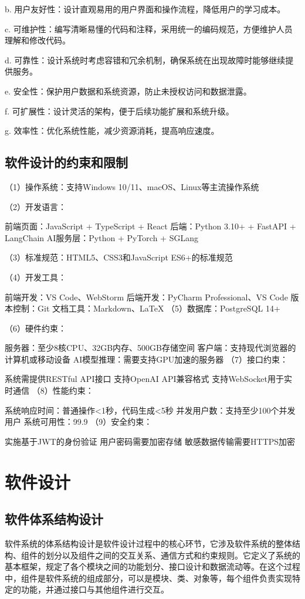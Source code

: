 \documentclass[
    report,     %
    oneside,    %
    UTF8,       %
    zihao=-4    %
]{config} %
\begin{document}
b. 用户友好性：设计直观易用的用户界面和操作流程，降低用户的学习成本。

c. 可维护性：编写清晰易懂的代码和注释，采用统一的编码规范，方便维护人员理解和修改代码。

d. 可靠性：设计系统时考虑容错和冗余机制，确保系统在出现故障时能够继续提供服务。

e. 安全性：保护用户数据和系统资源，防止未授权访问和数据泄露。

f. 可扩展性：设计灵活的架构，便于后续功能扩展和系统升级。

g. 效率性：优化系统性能，减少资源消耗，提高响应速度。
\subsection{软件设计的约束和限制}

（1）操作系统：支持Windows 10/11、macOS、Linux等主流操作系统

（2）开发语言：

前端页面：JavaScript + TypeScript + React
后端：Python 3.10+ + FastAPI + LangChain
AI服务层：Python + PyTorch + SGLang

（3）标准规范：HTML5、CSS3和JavaScript ES6+的标准规范

（4）开发工具：

前端开发：VS Code、WebStorm
后端开发：PyCharm Professional、VS Code
版本控制：Git
文档工具：Markdown、LaTeX
（5）数据库：PostgreSQL 14+

（6）硬件约束：

服务器：至少8核CPU、32GB内存、500GB存储空间
客户端：支持现代浏览器的计算机或移动设备
AI模型推理：需要支持GPU加速的服务器
（7）接口约束：

系统需提供RESTful API接口
支持OpenAI API兼容格式
支持WebSocket用于实时通信
（8）性能约束：

系统响应时间：普通操作<1秒，代码生成<5秒
并发用户数：支持至少100个并发用户
系统可用性：99.9%
（9）安全约束：

实施基于JWT的身份验证
用户密码需要加密存储
敏感数据传输需要HTTPS加密
\section{软件设计}
\subsection{软件体系结构设计}

软件系统的体系结构设计是软件设计过程中的核心环节，它涉及软件系统的整体结构、组件的划分以及组件之间的交互关系、通信方式和约束规则。它定义了系统的基本框架，规定了各个模块之间的功能划分、接口设计和数据流动等。在这个过程中，组件是软件系统的组成部分，可以是模块、类、对象等，每个组件负责实现特定的功能，并通过接口与其他组件进行交互。
\end{document}
